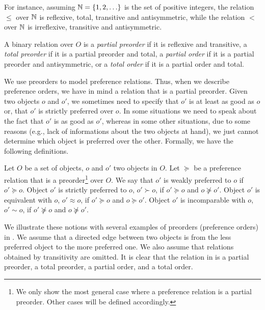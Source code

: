 For instance, assuming $\mathbb{N}=\{1,2,\ldots\}$ is the set of positive integers,
the  relation $\leq$ over $\mathbb{N}$ is reflexive,
total, transitive and antisymmetric, while the  relation
$<$ over $\mathbb{N}$ is irreflexive, transitive and antisymmetric.


\begin{definition}
\label{def:orders}
	A binary relation over $O$ is a \textit{partial preorder} if it is reflexive and transitive,
	a \textit{total preorder} if it is a partial preorder and total,
	a \textit{partial order} if it is a partial preorder and antisymmetric,
	or a \textit{total order} if it is a partial order and total.
\end{definition}

We use preorders to model preference relations.
Thus, when we describe preference orders, we have in mind a relation
that is a partial preorder.
Given two objects $o$ and $o'$,
we sometimes need to specify that $o'$ is at least as good as $o$ or,
that $o'$ is strictly preferred over $o$.
In some situations we need to speak about the fact that $o'$ is
as good as $o'$, whereas in some other situations, due to some reasons
(e.g., lack of informations about the two objects at hand), we just
cannot determine which object is preferred over the other.  Formally,
we have the following definitions.
\begin{definition}
	Let $O$ be a set of objects, $o$ and $o'$ two objects in $O$.
	Let $\succeq$ be a preference relation that is a preorder\footnote{
		We only show the most general case where a preference relation is
		a partial preorder.  Other cases will be defined accordingly.
	}
	over $O$.
	We say that $o'$ is weakly preferred to $o$ if $o' \succeq o$.
	Object $o'$ is strictly preferred to $o$, $o' \succ o$, if $o' \succeq o$ and $o \not \succeq o'$.
	Object $o'$ is equivalent with $o$, $o' \approx o$, if $o' \succeq o$ and $o \succeq o'$.
	Object $o'$ is incomparable with $o$, $o' \sim o$, if $o' \not \succeq o$ and $o \not \succeq o'$.
\end{definition}

We illustrate these notions with several examples of preorders (preference orders)
in .
We assume that a directed edge between two objects is from the less preferred object to
the more preferred one.
We also assume that relations obtained by transitivity are omitted.
It is clear that the relation in  is a partial 
preorder,  a total preorder,  a partial
order, and  a total order.


